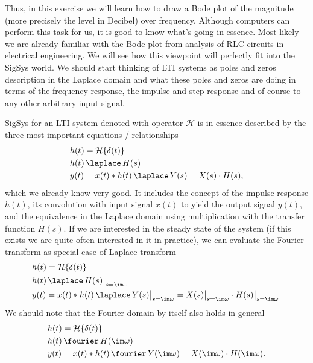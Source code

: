 Thus, in this exercise we will learn how to draw a Bode plot of the
magnitude (more precisely the level in Decibel) over frequency.
Although computers can perform this task for us, it is good to
know what's going in essence.
Most likely we are already familiar with the Bode plot from analysis of RLC
circuits in electrical engineering. We will see how this viewpoint will
perfectly fit into the SigSys world. We should start thinking of LTI systems as
poles and zeros description in the Laplace domain and what these poles and zeros
are doing in terms of the frequency response, the impulse and step response and
of course to any other arbitrary input signal.

\begin{mdframed}
SigSys for an LTI system denoted with operator $\mathcal{H}$ is in essence described
by the three most important equations / relationships
\begin{align}
&h(t) = \mathcal{H}\{\delta(t)\}\\
&h(t) \,\laplace\, H(s)\\
&y(t) = x(t) \ast h(t) \,\laplace\, Y(s) = X(s) \cdot H(s),
\end{align}
which we already know very good.
%
It includes the concept of the impulse response $h(t)$, its convolution with input
signal $x(t)$ to yield the output signal $y(t)$, and the equivalence in the Laplace
domain using multiplication with the transfer function $H(s)$.
If we are interested in the steady state of the system
(if this exists we are quite often interested in it in practice),
we can evaluate the Fourier transform as special case of Laplace transform
\begin{align}
&h(t) = \mathcal{H}\{\delta(t)\}\\
&h(t) \,\laplace\, H(s)\big|_{s=\im\omega}\\
&y(t) = x(t) \ast h(t) \,\laplace\, Y(s)\big|_{s=\im\omega} = X(s)\big|_{s=\im\omega} \cdot H(s)\big|_{s=\im\omega}.
\end{align}
%
We should note that the Fourier domain by itself also holds in general
\begin{align}
&h(t) = \mathcal{H}\{\delta(t)\}\\
&h(t) \,\fourier\, H(\im\omega)\\
&y(t) = x(t) \ast h(t) \,\fourier\, Y(\im\omega) = X(\im\omega) \cdot H(\im\omega).
\end{align}
\end{mdframed}

\clearpage

